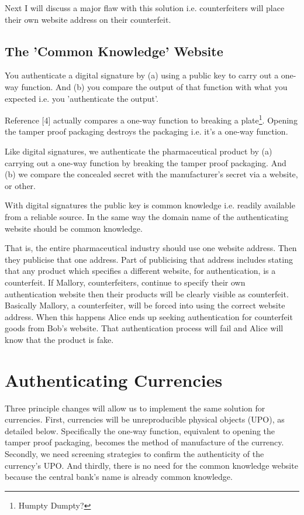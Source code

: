 \documentclass[smallextended]{svjour3}       	\smartqed  \usepackage{graphicx}
\begin{document}
\vspace{1mm}

Next I will discuss a major flaw with this solution i.e. counterfeiters will place their own website address on their counterfeit.

\subsection{The 'Common Knowledge' Website}

You authenticate a digital signature by (a) using a public key to carry out a one-way function. And (b) you compare the output of that function with what you expected i.e. you 'authenticate the output'.

Reference [4] actually compares a one-way function to breaking a plate\footnote{Humpty Dumpty?}. Opening the tamper proof packaging destroys the packaging i.e. it's a one-way function. 

Like digital signatures, we authenticate the pharmaceutical product by (a) carrying out a one-way function by breaking the tamper proof packaging. And (b) we compare the concealed secret with the manufacturer's secret via a website, or other.

With digital signatures the public key is common knowledge i.e. readily available from a reliable source. In the same way the domain name of the authenticating website should be common knowledge.

That is, the entire pharmaceutical industry should use one website address. Then they publicise that one address. Part of publicising that address includes stating that any product which specifies a different website, for authentication, is a counterfeit. If Mallory, counterfeiters, continue to specify their own authentication website then their products will be clearly visible as counterfeit. Basically Mallory, a counterfeiter, will be forced into using the correct website address. When this happens Alice ends up seeking authentication for counterfeit goods from Bob's website. That authentication process will fail and Alice will know that the product is fake.

\section{Authenticating Currencies}

Three principle changes will allow us to implement the same solution for currencies. First, currencies will be unreproducible physical objects (UPO), as detailed below. Specifically the one-way function, equivalent to opening the tamper proof packaging, becomes the method of manufacture of the currency. Secondly, we need screening strategies to confirm the authenticity of the currency's UPO. And thirdly, there is no need for the common knowledge website because the central bank's name is already common knowledge.
\end{document}
